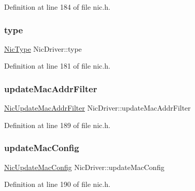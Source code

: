 Definition at line 184 of file nic.\+h.

\mbox{\label{structNicDriver_a685aebf8f2369d307969e464d01a03ad}} 
\subsubsection{\texorpdfstring{type}{type}}
{\footnotesize\ttfamily \hyperlink{nic_8h_ac1ce8659a9797513ecd9cc1afedce40b}{Nic\+Type} Nic\+Driver\+::type}



Definition at line 181 of file nic.\+h.

\mbox{\label{structNicDriver_a4062e60f50c3a4e8977df0e468c856fc}} 
\subsubsection{\texorpdfstring{update\+Mac\+Addr\+Filter}{updateMacAddrFilter}}
{\footnotesize\ttfamily \hyperlink{nic_8h_a1e0d018c9a510a084370e7e8a354e54d}{Nic\+Update\+Mac\+Addr\+Filter} Nic\+Driver\+::update\+Mac\+Addr\+Filter}



Definition at line 189 of file nic.\+h.

\mbox{\label{structNicDriver_a5e331ca11852729ad484485d9e7cf3f2}} 
\subsubsection{\texorpdfstring{update\+Mac\+Config}{updateMacConfig}}
{\footnotesize\ttfamily \hyperlink{nic_8h_a24c14c5747a3d68e12393a0bf9ede8fb}{Nic\+Update\+Mac\+Config} Nic\+Driver\+::update\+Mac\+Config}



Definition at line 190 of file nic.\+h.

\mbox{\label{structNicDriver_af7e678d0b00c8903e00ca02fa0b7bdf4}} 
